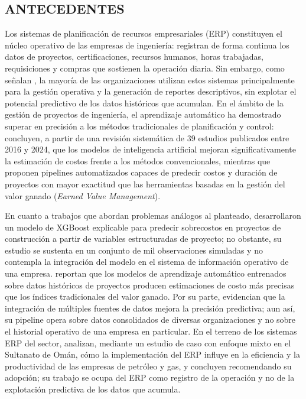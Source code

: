 
\subsection{ANTECEDENTES}

Los sistemas de planificación de recursos empresariales (ERP) constituyen el núcleo operativo de las empresas de ingeniería: registran de forma continua los datos de proyectos, certificaciones, recursos humanos, horas trabajadas, requisiciones y compras que sostienen la operación diaria. Sin embargo, como señalan \textcite{MLdrivenERP2023}, la mayoría de las organizaciones utilizan estos sistemas principalmente para la gestión operativa y la generación de reportes descriptivos, sin explotar el potencial predictivo de los datos históricos que acumulan. En el ámbito de la gestión de proyectos de ingeniería, el aprendizaje automático ha demostrado superar en precisión a los métodos tradicionales de planificación y control: \textcite{AIcostEstimation2024} concluyen, a partir de una revisión sistemática de 39 estudios publicados entre 2016 y 2024, que los modelos de inteligencia artificial mejoran significativamente la estimación de costos frente a los métodos convencionales, mientras que \textcite{AutoMLpipeline2025} proponen pipelines automatizados capaces de predecir costos y duración de proyectos con mayor exactitud que las herramientas basadas en la gestión del valor ganado (\textit{Earned Value Management}).

En cuanto a trabajos que abordan problemas análogos al planteado, \textcite{XGBoostCostOverrun2026} desarrollaron un modelo de XGBoost explicable para predecir sobrecostos en proyectos de construcción a partir de variables estructuradas de proyecto; no obstante, su estudio se sustenta en un conjunto de mil observaciones simuladas y no contempla la integración del modelo en el sistema de información operativo de una empresa. \textcite{MLcostForecasting2022} reportan que los modelos de aprendizaje automático entrenados sobre datos históricos de proyectos producen estimaciones de costo más precisas que los índices tradicionales del valor ganado. Por su parte, \textcite{AutoMLpipeline2025} evidencian que la integración de múltiples fuentes de datos mejora la precisión predictiva; aun así, su pipeline opera sobre datos consolidados de diversas organizaciones y no sobre el historial operativo de una empresa en particular. En el terreno de los sistemas ERP del sector, \textcite{AlJafari2018} analizan, mediante un estudio de caso con enfoque mixto en el Sultanato de Omán, cómo la implementación del ERP influye en la eficiencia y la productividad de las empresas de petróleo y gas, y concluyen recomendando su adopción; su trabajo se ocupa del ERP como registro de la operación y no de la explotación predictiva de los datos que acumula.

